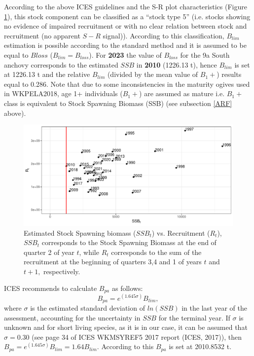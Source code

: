 \documentclass[review]{elsarticle}
\begin{document}
According to the above ICES guidelines and the S-R plot characteristics (Figure \ref{SSBt_1rect}), this stock component can be classified as a “stock type 5” (i.e. stocks showing no evidence of impaired recruitment or with no clear relation between stock and recruitment (no apparent $S-R$ signal)). According to this classification, $B_{lim}$ estimation is possible according to the standard method and it is assumed to be equal to $Bloss$ ($B_{lim}=B_{loss}$). For \textbf{2023} the value of $B_{loss}$ for the 9a South anchovy corresponds to the estimated $SSB$ in \textbf{2010} (1226.13 t),  hence $B_{lim}$ is set at 1226.13 t and the relative $B_{lim}$ (divided by the mean value of $B_1+$) results equal to 0.286. Note that due to some inconsistencies in the maturity ogives used in WKPELA2018, age 1+ individuals ($B_1+$) are assumed as mature i.e. $B_1+$ class is equivalent to Stock Spawning Biomass (SSB) (see subsection \ref{ARF} above).
\begin{figure}[h!]
 \centering
 \includegraphics[bb=0 0 595 288]{./SSBt_1rect.pdf}
 \caption{Estimated Stock Spawning biomass ($SSB_{t}$) vs. Recruitment ($R_{t}$), $SSB_{t}$ corresponds to the Stock Spawning Biomass at the end of quarter 2 of year $t$, while $R_{t}$ corresponds to the sum of the recruitment at the beginning of quarters 3,4 and 1 of years $t$ and $t+1,$ respectively.}
 \label{SSBt_1rect}
\end{figure}

ICES recommends to calculate $B_{pa}$ as follows: $$B_{pa} = e^{(1.645\sigma)} B_{lim},$$
where  $\sigma$  is the estimated standard deviation of $ln(SSB)$ in the last year of the assessment, accounting for the uncertainty in $SSB$ for the terminal year.  If $\sigma$ is unknown and for short living species, as it is in our case, it can be assumed that $\sigma = 0.30$ (see page 34 of ICES WKMSYREF5 2017 report (ICES, 2017)), then $B_{pa} = e^{(1.645\sigma)}B_{lim}=1.64B_{lim}$. According to this $B_{pa}$ is set at 2010.8532 t.
\end{document}
